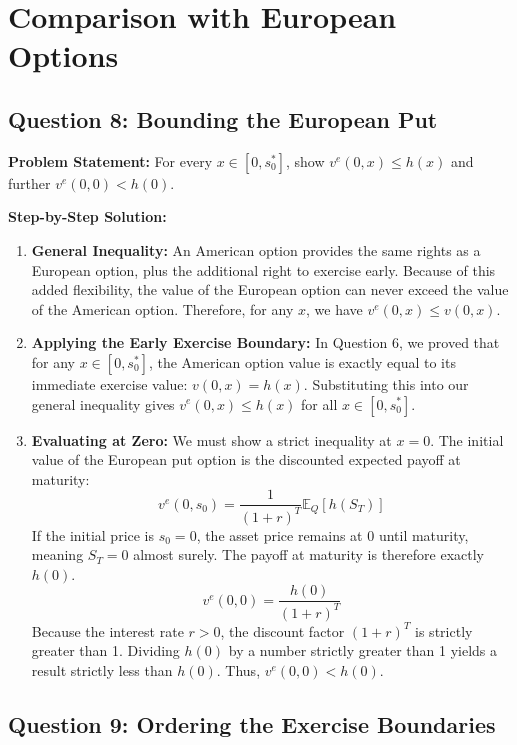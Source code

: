 \section{Comparison with European Options}

\subsection*{Question 8: Bounding the European Put}

\textbf{Problem Statement:}
For every $x \in [0,s_0^*]$, show $v^e(0,x) \le h(x)$ and further $v^e(0,0) < h(0)$.

\textbf{Step-by-Step Solution:}
\begin{enumerate}
    \item \textbf{General Inequality:} An American option provides the same rights as a European option, plus the additional right to exercise early. Because of this added flexibility, the value of the European option can never exceed the value of the American option. Therefore, for any $x$, we have $v^e(0,x) \le v(0,x)$.
    
    \item \textbf{Applying the Early Exercise Boundary:} In Question 6, we proved that for any $x \in [0, s_0^*]$, the American option value is exactly equal to its immediate exercise value: $v(0,x) = h(x)$.
    Substituting this into our general inequality gives $v^e(0,x) \le h(x)$ for all $x \in [0, s_0^*]$.
    
    \item \textbf{Evaluating at Zero:} We must show a strict inequality at $x=0$. The initial value of the European put option is the discounted expected payoff at maturity:
    \begin{equation*}
        v^e(0,s_0) = \frac{1}{(1+r)^T} \mathbb{E}_Q[h(S_T)]
    \end{equation*}
    If the initial price is $s_0 = 0$, the asset price remains at 0 until maturity, meaning $S_T = 0$ almost surely. The payoff at maturity is therefore exactly $h(0)$.
    \begin{equation*}
        v^e(0,0) = \frac{h(0)}{(1+r)^T}
    \end{equation*}
    Because the interest rate $r > 0$, the discount factor $(1+r)^T$ is strictly greater than 1. Dividing $h(0)$ by a number strictly greater than 1 yields a result strictly less than $h(0)$. Thus, $v^e(0,0) < h(0)$.
\end{enumerate}

\subsection*{Question 9: Ordering the Exercise Boundaries}

